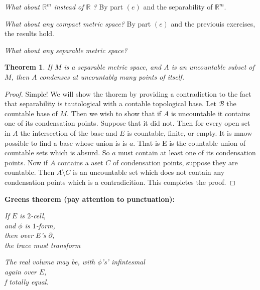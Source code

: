 \documentclass[letter]{article}
\newtheorem{theorem}{Theorem}
\newenvironment{menumerate}{%
  \edef\backupindent{\the\parindent}%
  \enumerate%
  \setlength{\parindent}{\backupindent}%
}{\endenumerate}
\begin{document}
\begin{menumerate}
\begin{menumerate}
		\item \emph{What about $\mathbb{R}^m$ instead of $\mathbb{R}$ ?}
			By part $(e)$ and the separability of $\mathbb{R}^m.$
		\item \emph{What about any compact metric space?}
			By part $(e)$ and the previouis exercises, the results hold.
		\item \emph{What about any separable metric space?}
		\begin{theorem}
			If $M$ is a separable metric space, and $A$ is an uncountable subset of $M$, then $A$ condenses at uncountably many points of itself.
		\end{theorem}
		\begin{proof}
			Simple! We will show the thorem by providing a contradiction to the fact that separability is tautological with a contable topological base. Let $\mathcal{B}$ the countable base of $M.$ Then we wish to show that if $A$ is uncountable it contains one of its condensation points. Suppose that it did not. Then for every open set in $A$ the intersection of the base and $E$ is countable, finite, or empty. It is mnow possible to find a base whose union is is $a$. That is E is the countable union of countable sets which is absurd. So $a$ must contain at least one of its condensation points. Now if $A$ contains a aset $C$ of condensation points, suppose they are countable. Then $A \setminus C$ is an uncountable set which does not contain any condensation points which is a contradicition. This completes the proof.


		\end{proof}
		\end{menumerate}

	\setcounter{enumi}{151}
	\item \textbf{Greens theorem (pay attention to punctuation):}

	\emph{If $E$ is $2$-cell, \\
		and $\phi$ is $1$-form, \\ 
		then over $E$'s $\partial$, \\
		the trace must transform }

		\emph{		The real volume may be, 
		with $\phi$'s' infintesmal \\
		again over $E$, \\f
		totally equal.}
\end{menumerate}
\end{document}
